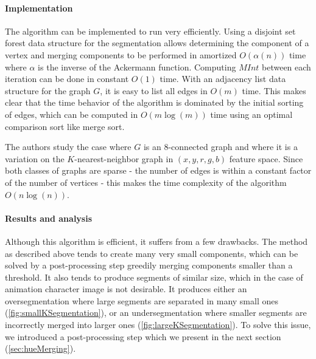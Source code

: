 \paragraph{Implementation} The algorithm can be implemented to run very efficiently. Using a disjoint set forest data structure for the segmentation allows determining the component of a vertex and merging components to be performed in amortized $O(\alpha(n))$ time where $\alpha$ is the inverse of the Ackermann function. Computing $MInt$ between each iteration can be done in constant $O(1)$ time. With an adjacency list data structure for the graph $G$, it is easy to list all edges in $O(m)$ time. This makes clear that the time behavior of the algorithm is dominated by the initial sorting of edges, which can be computed in $O(m\log(m))$ time using an optimal comparison sort like merge sort.

The authors study the case where $G$ is an $8$-connected graph and where it is a variation on the $K$-nearest-neighbor graph\footnotemark
{}
 in $(x, y, r, g, b)$ feature space. Since both classes of graphs are sparse - the number of edges is within a constant factor of the number of vertices - this makes the time complexity of the algorithm $O(n\log(n))$.

\paragraph{Results and analysis} Although this algorithm is efficient, it suffers from a few drawbacks. The method as described above tends to create many very small components, which can be solved by a post-processing step greedily merging components smaller than a threshold. It also tends to produce segments of similar size, which in the case of animation character image is not desirable. It produces either an oversegmentation where large segments are separated in many small ones (\autoref{fig:smallKSegmentation}), or an undersegmentation where smaller segments are incorrectly merged into larger ones (\autoref{fig:largeKSegmentation}). To solve this issue, we introduced a post-processing step which we present in the next section (\autoref{sec:hueMerging}).

